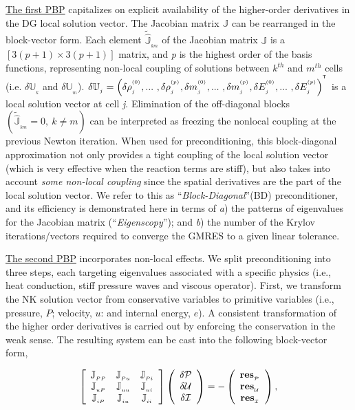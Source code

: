 \documentclass{report}
\begin{document}
\underline{The first PBP} capitalizes on explicit availability of the
higher-order derivatives in the DG local solution vector. The Jacobian
matrix $\mathbb{J} $ can be rearranged in the block-vector form. Each
element $\tilde{\hat{\mathbb J}}_{_{km}} $ of the Jacobian matrix
$\mathbb{J} $ is a $\left[3 \left(p+1 \right) \times 3 \left(p+1 \right)
\right]$ matrix, and \textit{p} is the highest order of the basis
functions, representing non-local coupling of solutions between $k^{th}$
and $m^{th}$ cells (i.e. $\delta \mathbb{U}_{_k} $ and $\delta
\mathbb{U}_{_m} $). $\delta \mathbb{U}_{_{j}}=\left( \delta
\rho_{_j}^{^{(0)}}, ...~, \delta \rho_{_j}^{^{(p)}}, \delta
m_{_j}^{^{(0)}}, ...~, \delta m_{_j}^{^{(p)}}, \delta E_{_j}^{^{(0)}},
...~, \delta E_{_j}^{^{(p)}} \right)^{^{\sf T}} $ is a local solution
vector at cell \textit{j}. Elimination of the off-diagonal blocks
$\left(\tilde{\hat{\mathbb J}}_{_{km}}=0,~ k \neq m \right)$ can be
interpreted as freezing the nonlocal coupling at the previous Newton
iteration. When used for preconditioning, this block-diagonal
approximation not only provides a tight coupling of the local solution
vector (which is very effective when the reaction terms are stiff), but
also takes into account \textit{some non-local coupling} since the
spatial derivatives are the part of the local solution vector. We refer
to this as ``\textit{Block-Diagonal}''(BD) preconditioner, and its
efficiency is demonstrated here in terms of \textit{a}) the patterns of
eigenvalues for the Jacobian matrix (``\textit{Eigenscopy}''); and
\textit{b}) the number of the Krylov iterations/vectors required to
converge the GMRES to a given linear tolerance.

\underline{The second PBP} incorporates non-local effects. We split
preconditioning into three steps, each targeting eigenvalues associated
with a specific physics (i.e., heat conduction, stiff pressure waves and
viscous operator). First, we transform the NK solution vector from
conservative variables to primitive variables (i.e., pressure, $P$;
velocity, $u$: and internal energy, $e$). A consistent transformation of
the higher order derivatives is carried out by enforcing the conservation
in the weak sense. The resulting system can be cast into the following
block-vector form,

\[ \left[ \begin{array}{ccc} \mathbb{J}_{_{P P}} &\mathbb{J}_{_{P u}} &
\mathbb{J}_{_{P i}} \\ \mathbb{J}_{_{u P}} &\mathbb{J}_{_{u u}} &
\mathbb{J}_{_{u i}} \\ \mathbb{J}_{_{i P}} &\mathbb{J}_{_{i u}} &
\mathbb{J}_{_{i i}} \end{array} \right] \left( \begin{array}{c} \delta
{\cal P} \\ \delta {\cal U} \\ \delta {\cal I} \end{array} \right) =-
\left( \begin{array}{c} {\bf res}_{_{\cal P}} \\ {\bf res}_{_{\cal U}} \\
{\bf res}_{_{\cal I}} \end{array} \right), \]
\end{document}
